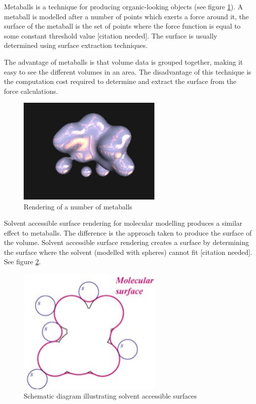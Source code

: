 Metaballs is a technique for producing organic-looking objects (see figure
\ref{fig:metaballs}). A metaball is modelled after a number of points which
exerts a force around it, the surface of the metaball is the set of points
where the force function is equal to some constant threshold value [citation
needed]. The surface is usually determined using surface extraction techniques.

The advantage of metaballs is that volume data is grouped together, making it
easy to see the different volumes in an area. The disadvantage of this
technique is the computation cost required to determine and extract the surface
from the force calculations.

\begin{figure}[h!]
  \begin{center}
    \includegraphics[width=70mm]{metaballs}
  \end{center}
  \caption{Rendering of a number of metaballs}
  \label{fig:metaballs}
\end{figure}

Solvent accessible surface rendering for molecular modelling produces a similar
effect to metaballs. The difference is the approach taken to produce the
surface of the volume. Solvent accessible surface rendering creates a surface
by determining the surface where the solvent (modelled with spheres) cannot
fit [citation needed]. See figure \ref{fig:sas}.

\begin{figure}[h!]
  \begin{center}
    \includegraphics[width=70mm]{sas_ms}
  \end{center}
  \caption{Schematic diagram illustrating solvent accessible surfaces}
  \label{fig:sas}
\end{figure}

